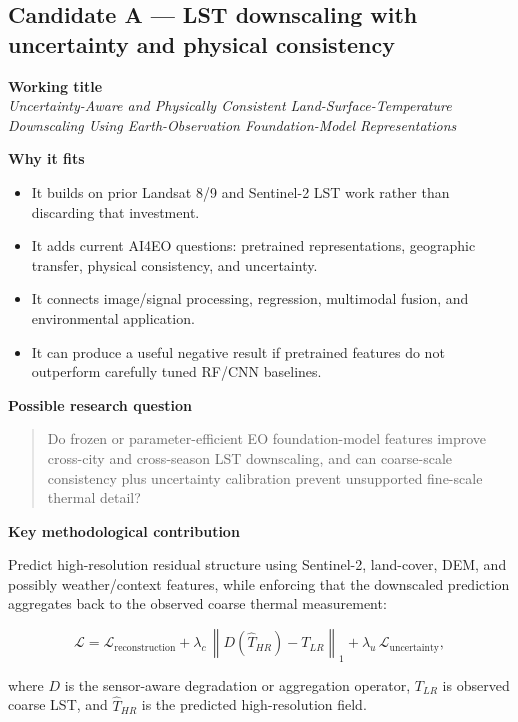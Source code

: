 \documentclass[
  a4paper,
  11pt]{article}
\providecommand{\tightlist}{%
  \setlength{\itemsep}{0pt}\setlength{\parskip}{0pt}}
\begin{document}
\hypertarget{candidate-a-lst-downscaling-with-uncertainty-and-physical-consistency}{%
\subsection{Candidate A --- LST downscaling with uncertainty and
physical
consistency}\label{candidate-a-lst-downscaling-with-uncertainty-and-physical-consistency}}

\textbf{Working title}\\
\emph{Uncertainty-Aware and Physically Consistent
Land-Surface-Temperature Downscaling Using Earth-Observation
Foundation-Model Representations}

\textbf{Why it fits}

\begin{itemize}
\tightlist
\item
  It builds on prior Landsat 8/9 and Sentinel-2 LST work rather than
  discarding that investment.
\item
  It adds current AI4EO questions: pretrained representations,
  geographic transfer, physical consistency, and uncertainty.
\item
  It connects image/signal processing, regression, multimodal fusion,
  and environmental application.
\item
  It can produce a useful negative result if pretrained features do not
  outperform carefully tuned RF/CNN baselines.
\end{itemize}

\textbf{Possible research question}

\begin{quote}
Do frozen or parameter-efficient EO foundation-model features improve
cross-city and cross-season LST downscaling, and can coarse-scale
consistency plus uncertainty calibration prevent unsupported fine-scale
thermal detail?
\end{quote}

\textbf{Key methodological contribution}

Predict high-resolution residual structure using Sentinel-2, land-cover,
DEM, and possibly weather/context features, while enforcing that the
downscaled prediction aggregates back to the observed coarse thermal
measurement:

\[
\mathcal{L} = \mathcal{L}_{\text{reconstruction}} + \lambda_{c}\,\left\|D(\hat{T}_{HR})-T_{LR}\right\|_1 + \lambda_{u}\,\mathcal{L}_{\text{uncertainty}},
\]

where \(D\) is the sensor-aware degradation or aggregation operator,
\(T_{LR}\) is observed coarse LST, and \(\hat{T}_{HR}\) is the
predicted high-resolution field.
\end{document}
